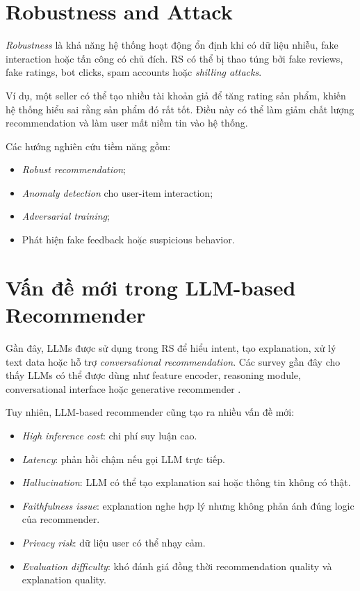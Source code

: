 \documentclass[12pt,a4paper]{article}
\begin{document}
\section{Robustness and Attack}

\textit{Robustness} là khả năng hệ thống hoạt động ổn định khi có dữ liệu nhiễu, fake interaction hoặc tấn công có chủ đích. 
RS có thể bị thao túng bởi fake reviews, fake ratings, bot clicks, spam accounts hoặc \textit{shilling attacks}.

Ví dụ, một seller có thể tạo nhiều tài khoản giả để tăng rating sản phẩm, khiến hệ thống hiểu sai rằng sản phẩm đó rất tốt. 
Điều này có thể làm giảm chất lượng recommendation và làm user mất niềm tin vào hệ thống.

Các hướng nghiên cứu tiềm năng gồm:

\begin{itemize}[leftmargin=*]
    \item \textit{Robust recommendation};
    \item \textit{Anomaly detection} cho user-item interaction;
    \item \textit{Adversarial training};
    \item Phát hiện fake feedback hoặc suspicious behavior.
\end{itemize}

\section{Vấn đề mới trong LLM-based Recommender}

Gần đây, LLMs được sử dụng trong RS để hiểu intent, tạo explanation, xử lý text data hoặc hỗ trợ \textit{conversational recommendation}. 
Các survey gần đây cho thấy LLMs có thể được dùng như feature encoder, reasoning module, conversational interface hoặc generative recommender \cite{wu2024llmrec,fan2024llmrec}.

Tuy nhiên, LLM-based recommender cũng tạo ra nhiều vấn đề mới:

\begin{itemize}[leftmargin=*]
    \item \textit{High inference cost}: chi phí suy luận cao.
    \item \textit{Latency}: phản hồi chậm nếu gọi LLM trực tiếp.
    \item \textit{Hallucination}: LLM có thể tạo explanation sai hoặc thông tin không có thật.
    \item \textit{Faithfulness issue}: explanation nghe hợp lý nhưng không phản ánh đúng logic của recommender.
    \item \textit{Privacy risk}: dữ liệu user có thể nhạy cảm.
    \item \textit{Evaluation difficulty}: khó đánh giá đồng thời recommendation quality và explanation quality.
\end{itemize}
\end{document}
